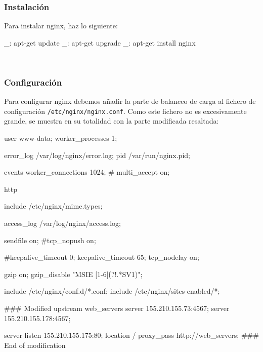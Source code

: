 \subsubsection{Instalación}

Para instalar nginx, haz lo siguiente:

\begin{bashcode}
_: apt-get update
_: apt-get upgrade
_: apt-get install nginx
\end{bashcode}
\\


\subsubsection{Configuración}

Para configurar nginx debemos añadir la parte de balanceo de carga al fichero de configuración \texttt{/etc/nginx/nginx.conf}. Como este fichero no es excesivamente grande, se muestra en su totalidad con la parte modificada resaltada:

\begin{bashcode}
user www-data;
worker_processes  1;

error_log  /var/log/nginx/error.log;
pid        /var/run/nginx.pid;

events {
    worker_connections  1024;
    # multi_accept on;
}

http {
    include       /etc/nginx/mime.types;

    access_log	/var/log/nginx/access.log;

    sendfile        on;
    #tcp_nopush     on;

    #keepalive_timeout  0;
    keepalive_timeout  65;
    tcp_nodelay        on;

    gzip  on;
    gzip_disable "MSIE [1-6]\.(?!.*SV1)";

    include /etc/nginx/conf.d/*.conf;
    include /etc/nginx/sites-enabled/*;


    ### Modified
    upstream web_servers {
      server 155.210.155.73:4567;
      server 155.210.155.178:4567;
    }

    server {
      listen 155.210.155.175:80;
      location / {
        proxy_pass http://web_servers;
      }
    }
    ### End of modification


}
\end{bashcode}
\\


